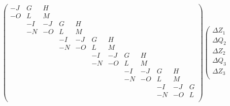 \begin{equation}
    \left(
         \begin{array}{cccccccccccc}
          \scriptscriptstyle -J & \scriptscriptstyle G & \scriptscriptstyle H & & & & & & & & & \\
           \scriptscriptstyle -O & \scriptscriptstyle L & \scriptscriptstyle M & & & & & & & & & \\
              & \scriptscriptstyle -I & \scriptscriptstyle -J & \scriptscriptstyle G & \scriptscriptstyle H & & & & & & & \\
              & \scriptscriptstyle -N & \scriptscriptstyle -O & \scriptscriptstyle L & \scriptscriptstyle M & & & &  & & & \\
              & & & \scriptscriptstyle -I & \scriptscriptstyle -J & \scriptscriptstyle G & \scriptscriptstyle H & & & & & \\
              & & & \scriptscriptstyle -N & \scriptscriptstyle -O & \scriptscriptstyle L & \scriptscriptstyle M & & & & & \\
              & & & & & \scriptscriptstyle -I & \scriptscriptstyle -J & \scriptscriptstyle G & \scriptscriptstyle H & & & \\
              & & & & & \scriptscriptstyle -N & \scriptscriptstyle -O & \scriptscriptstyle L & \scriptscriptstyle M & & & \\
              & & & & & & & \scriptscriptstyle -I & \scriptscriptstyle -J & \scriptscriptstyle G & \scriptscriptstyle H & \\
              & & & & & & & \scriptscriptstyle -N & \scriptscriptstyle -O & \scriptscriptstyle L & \scriptscriptstyle M & \\
              & & & & & & & & & \scriptscriptstyle -I & \scriptscriptstyle -J & \scriptscriptstyle G \\
              & & & & & & & & & \scriptscriptstyle -N & \scriptscriptstyle -O & \scriptscriptstyle L \\
         \end{array}
    \right)
    \left(
            \begin{array}{c}
               \scriptscriptstyle \Delta Z_1\\
               \scriptscriptstyle \Delta Q_2\\
               \scriptscriptstyle \Delta Z_2\\
               \scriptscriptstyle \Delta Q_3\\
               \scriptscriptstyle \Delta Z_3\\

\end{array}
\end{equation}
